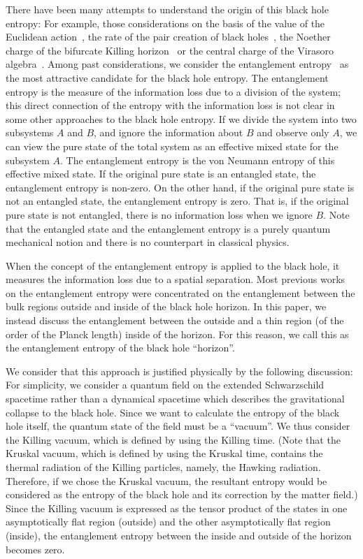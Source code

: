 \documentclass[12pt,epsf]{article}
\def\Rn#1{\uppercase\expandafter{\romannumeral#1}}
\begin{document}
There have been many attempts
to understand the origin of this black hole entropy:
For example, those considerations on the basis of
the value of the Euclidean
action~\cite{GibHaw77,Hawkin79,BroYor93b,BaTeZa94,HawHun99},
the rate of the pair creation of black holes~\cite{GaGiSt94},
the Noether charge of the bifurcate Killing
horizon~\cite{Wald93,IyeWal94} or
the central charge of the Virasoro
algebra~\cite{Carlip95,Stromi98,Carlip99}.
Among past considerations, we consider the entanglement
entropy~\cite{BKLS86,Sredni93,FroNov93,CalWil94,%
KabStr94,HoLaWi94,MuSeKo97,MuSeKo98,Others}
as the most attractive candidate for the black hole entropy.
The entanglement entropy is the measure of the
information loss due to a division of the system;
this direct connection of the entropy with the information loss
is not clear in some other approaches to the black hole entropy.
If we divide the system into two subsystems $A$ and $B$,
and ignore the information about $B$ and observe only $A$,
we can view the pure state of the total system as
an effective mixed state for the subsystem $A$.
The entanglement entropy is the von Neumann entropy
of this effective mixed state.
If the original pure state is an entangled state,
the entanglement entropy is non-zero.
On the other hand, if the original pure state is not 
an entangled state, the entanglement entropy is zero.
That is, if the original pure state is not entangled,
there is no information loss when we ignore $B$.
Note that the entangled state and the entanglement entropy is
a purely quantum mechanical notion and
there is no counterpart in classical physics.

When the concept of the entanglement entropy
is applied to the black hole,
it measures the information loss due to a spatial separation.
Most previous works on the entanglement entropy were
concentrated on the entanglement between the bulk regions outside
and inside of the black hole horizon.
In this paper, we instead discuss the entanglement
between the outside and a thin region
(of the order of the Planck length) inside of the horizon.
For this reason, we call this as
the entanglement entropy of the black hole ``horizon''.

We consider that this approach is justified physically
by the following discussion:
For simplicity,
we consider a quantum field on the extended Schwarzschild
spacetime rather than a dynamical spacetime which describes
the gravitational collapse to the black hole.
Since we want to calculate
the entropy of the black hole itself,
the quantum state of the field must be a ``vacuum''.
We thus consider the Killing vacuum,
which is defined by using the Killing time.
(Note that the Kruskal vacuum,
which is defined by using the Kruskal time,
contains the thermal radiation of the Killing particles,
namely, the Hawking radiation.
Therefore, if we chose the Kruskal vacuum,
the resultant entropy would be considered as the
entropy of the black hole and its correction by the matter field.)
Since
the Killing vacuum is expressed as the tensor product of
the states in one asymptotically flat region \Rn{1} (outside)
and the other asymptotically flat region \Rn{2} (inside),
the entanglement entropy between the inside and outside
of the horizon becomes zero.
\end{document}
